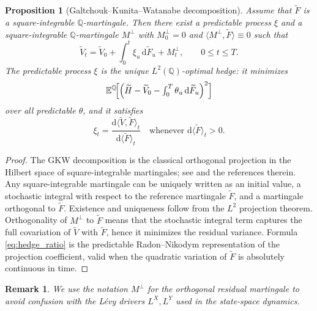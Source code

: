 \documentclass[10pt,a4paper,reqno]{amsart}
\newtheorem{proposition}[theorem]{Proposition}
\newtheorem{remark}[theorem]{Remark}
\newcommand{\E}{\mathbb{E}}
\newcommand{\Q}{\mathbb{Q}}
\newcommand{\1}{\mathbbm{1}}
\newcommand{\dd}{\mathrm{d}}
\begin{document}
\begin{proposition}[Galtchouk--Kunita--Watanabe decomposition]
\label{prop:gkw}
Assume that \(\widetilde{F}\) is a square-integrable \(\Q\)-martingale.
Then there exist a predictable process \(\xi\) and a square-integrable
\(\Q\)-martingale \(M^{\perp}\) with \(M^{\perp}_0=0\) and
\(\langle M^{\perp},\widetilde{F}\rangle \equiv 0\) such that
\begin{equation}\label{eq:gkw}
  \widetilde{V}_t
  = \widetilde{V}_0
    + \int_0^t \xi_u\,\dd \widetilde{F}_u
    + M^{\perp}_t,
  \qquad 0 \le t \le T.
\end{equation}
The predictable process \(\xi\) is the unique \(L^2(\Q)\)-optimal hedge:
it minimizes
\[
\E^{\Q}\!\Bigl[
  \Bigl(\widetilde{H}
  - \widetilde{V}_0
  - \textstyle\int_0^T \theta_u\,\dd\widetilde{F}_u\Bigr)^2
\Bigr]
\]
over all predictable \(\theta\), and it satisfies
\begin{equation}\label{eq:hedge_ratio}
  \xi_t
  = \frac{\dd \langle \widetilde{V},\widetilde{F}\rangle_t}
         {\dd \langle \widetilde{F}\rangle_t}
  \quad \text{whenever } \dd \langle \widetilde{F}\rangle_t > 0.
\end{equation}
\end{proposition}

\begin{proof}
The GKW decomposition is the classical orthogonal projection in the Hilbert
space of square-integrable martingales; see \citet{Sch01} and the references
therein. Any square-integrable martingale can be uniquely written as an
initial value, a stochastic integral with respect to the reference martingale
\(\widetilde{F}\), and a martingale orthogonal to \(\widetilde{F}\). Existence
and uniqueness follow from the \(L^2\) projection theorem.
Orthogonality of \(M^{\perp}\) to \(\widetilde{F}\) means that
the stochastic integral term captures the full covariation of \(\widetilde{V}\)
with \(\widetilde{F}\), hence it minimizes the residual variance. Formula
\eqref{eq:hedge_ratio} is the predictable Radon--Nikodym representation of the
projection coefficient, valid when the quadratic variation of \(\widetilde{F}\)
is absolutely continuous in time.
\end{proof}

\begin{remark}
We use the notation \(M^{\perp}\) for the orthogonal residual martingale to
avoid confusion with the Lévy drivers \(L^X, L^Y\) used in the state-space
dynamics.
\end{remark}
\end{document}
